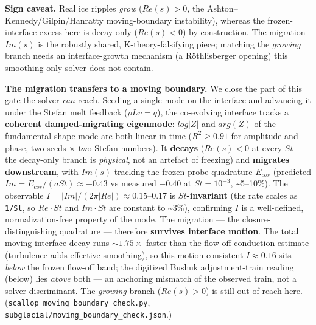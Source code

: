 \documentclass{jfm}
\newcommand{\code}[1]{\texttt{#1}}
\begin{document}
\textbf{Sign caveat.} Real ice ripples \emph{grow} ($Re(s)>0$, the Ashton–Kennedy/Gilpin/Hanratty moving-boundary instability), whereas the frozen-interface excess here is decay-only ($Re(s)<0$) by construction. The migration $Im(s)$ is the robustly shared, K-theory-falsifying piece; matching the \emph{growing} branch needs an interface-growth mechanism (a Röthlisberger opening) this smoothing-only solver does not contain.


\textbf{The migration transfers to a moving boundary.} We close the part of this gate the solver \emph{can} reach. Seeding a single mode on the interface and advancing it under the Stefan melt feedback ($\rho L v=q$), the co-evolving interface tracks a \textbf{coherent damped-migrating eigenmode}: $log|Z|$ and $arg(Z)$ of the fundamental shape mode are both linear in time ($R^{2}\ge 0.91$ for amplitude and phase, two seeds \ensuremath{\times} two Stefan numbers). It \textbf{decays} ($Re(s)<0$ at every $St$ — the decay-only branch is \emph{physical}, not an artefact of freezing) and \textbf{migrates downstream}, with $Im(s)$ tracking the frozen-probe quadrature $E_{cos}$ (predicted $Im=E_{cos}/(aSt)\approx -0.43$ vs measured $-0.40$ at $St=10^{-3}$, \textasciitilde{}5–10\%). The observable $I=|Im|/(2\pi |Re|)\approx 0.15–0.17$ is \textbf{$St$-invariant} (the rate scales as \code{1/\allowbreak{}St}, so $Re\cdot St$ and $Im\cdot St$ are constant to \textasciitilde{}3\%), confirming $I$ is a well-defined, normalization-free property of the mode. The migration — the closure-distinguishing quadrature — therefore \textbf{survives interface motion}. The total moving-interface decay runs $\sim 1.75\times $ faster than the flow-off conduction estimate (turbulence adds effective smoothing), so this motion-consistent $I\approx 0.16$ sits \emph{below} the frozen flow-off band; the digitized Bushuk adjustment-train reading (below) lies \emph{above} both — an anchoring mismatch of the observed train, not a solver discriminant. The \emph{growing} branch ($Re(s)>0$) is still out of reach here. (\code{scallop\_\allowbreak{}moving\_\allowbreak{}boundary\_\allowbreak{}check.\allowbreak{}py}, \code{subglacial/\allowbreak{}moving\_\allowbreak{}boundary\_\allowbreak{}check.\allowbreak{}json}.)
\end{document}
